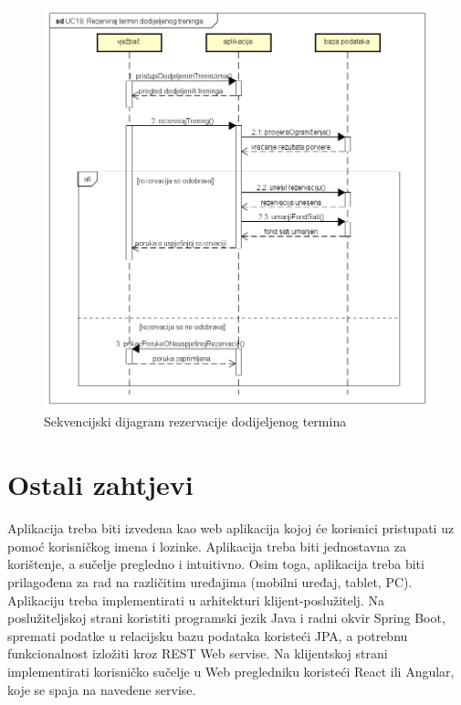                 \begin{figure}[H]
		              \includegraphics[scale=0.6]{./Dijagrami/UC18_ Rezerviraj_termin_dodijeljenog_treninga.png}
		              \centering
		              \caption{Sekvencijski dijagram rezervacije dodijeljenog termina}
		              \label{fig:promjene}
	            \end{figure}
               \eject
            
	
		\section{Ostali zahtjevi}
		
		 
			 {
			        Aplikacija treba biti izvedena kao web aplikacija kojoj će korisnici pristupati uz pomoć korisničkog imena i lozinke.\newline
                    Aplikacija treba biti jednostavna za korištenje, a sučelje pregledno i intuitivno. Osim toga, aplikacija treba biti prilagođena za rad na različitim uređajima (mobilni uređaj, tablet, PC).\newline
                    Aplikaciju treba implementirati u arhitekturi klijent-poslužitelj. Na poslužiteljskoj strani koristiti programski jezik Java i radni okvir Spring Boot, spremati podatke u relacijsku bazu podataka koristeći JPA, a potrebnu funkcionalnost izložiti kroz REST Web servise. \newline 
                    Na klijentskoj strani implementirati korisničko sučelje u Web pregledniku koristeći React ili Angular, koje se spaja na navedene servise.}
			 
			 
			 
	